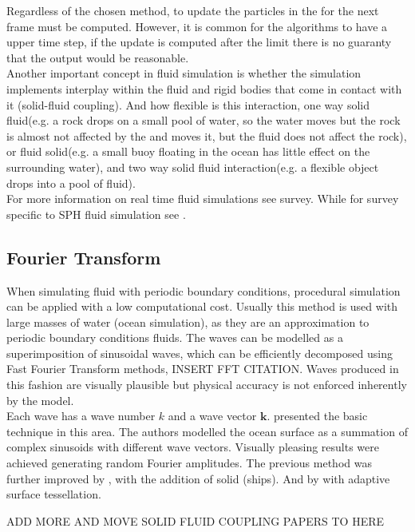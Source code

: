 Regardless of the chosen method, to update the particles in the for the next frame must be computed.
However, it is common for the algorithms to have a upper time step, if the update is computed after the limit there is no guaranty that the output would be reasonable.\\

Another important concept in fluid simulation is whether the simulation implements interplay within the fluid and rigid bodies that come in contact with it (solid-fluid coupling).
And how flexible is this interaction, one way solid fluid(e.g. a rock drops on a small pool of water, so the water moves but the rock is almost not affected by the  and moves it, but the fluid does not affect the rock), or fluid solid(e.g. a small buoy floating in the ocean has little effect on the surrounding water), and two way solid fluid interaction(e.g. a flexible object drops into a pool of fluid).\\

For more information on real time fluid simulations see \cite{Vines2012} survey.
While for survey specific to SPH fluid simulation see \cite{Ihmsen2014}.

\subsection{Fourier Transform}

When simulating fluid with periodic boundary conditions, procedural simulation can be applied with a low computational cost.
Usually this method is used with large masses of water (ocean simulation), as they are an approximation to periodic boundary conditions fluids.
The waves can be modelled as a superimposition of sinusoidal waves, which can be efficiently decomposed using Fast Fourier Transform methods, INSERT FFT CITATION.
Waves produced in this fashion are visually plausible but physical accuracy is not enforced inherently by the model.\\

Each wave has a wave number $k$ and a wave vector $\mathbf{k}$.
\cite{Tessendorf2001} presented the basic technique in this area.
The authors modelled the ocean surface as a summation of complex sinusoids with different wave vectors.
Visually pleasing results were achieved generating random Fourier amplitudes.
The previous method was further improved by \cite{Cieutat2003}, with the addition of solid (ships).
And by \cite{Chiu2006} with adaptive surface tessellation.


ADD MORE AND MOVE SOLID FLUID COUPLING PAPERS TO HERE

